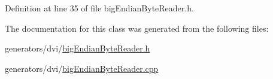 Definition at line 35 of file big\+Endian\+Byte\+Reader.\+h.



The documentation for this class was generated from the following files\+:\begin{DoxyCompactItemize}
\item 
generators/dvi/\hyperlink{bigEndianByteReader_8h}{big\+Endian\+Byte\+Reader.\+h}\item 
generators/dvi/\hyperlink{bigEndianByteReader_8cpp}{big\+Endian\+Byte\+Reader.\+cpp}\end{DoxyCompactItemize}
